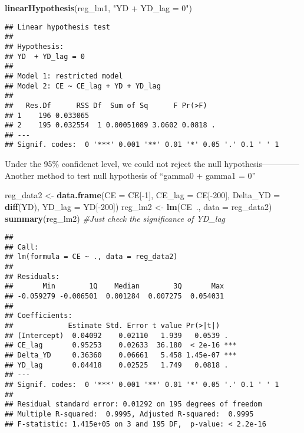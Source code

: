 \documentclass[]{article}
\newenvironment{Shaded}{\begin{snugshade}}{\end{snugshade}}
\newcommand{\KeywordTok}[1]{\textcolor[rgb]{0.13,0.29,0.53}{\textbf{{#1}}}}
\newcommand{\DataTypeTok}[1]{\textcolor[rgb]{0.13,0.29,0.53}{{#1}}}
\newcommand{\DecValTok}[1]{\textcolor[rgb]{0.00,0.00,0.81}{{#1}}}
\newcommand{\StringTok}[1]{\textcolor[rgb]{0.31,0.60,0.02}{{#1}}}
\newcommand{\CommentTok}[1]{\textcolor[rgb]{0.56,0.35,0.01}{\textit{{#1}}}}
\newcommand{\NormalTok}[1]{{#1}}
\begin{document}
\begin{Shaded}
\begin{Highlighting}[]
\KeywordTok{linearHypothesis}\NormalTok{(reg_lm1, }\StringTok{"YD + YD_lag = 0"}\NormalTok{)}
\end{Highlighting}
\end{Shaded}

\begin{verbatim}
## Linear hypothesis test
## 
## Hypothesis:
## YD  + YD_lag = 0
## 
## Model 1: restricted model
## Model 2: CE ~ CE_lag + YD + YD_lag
## 
##   Res.Df      RSS Df  Sum of Sq      F Pr(>F)  
## 1    196 0.033065                              
## 2    195 0.032554  1 0.00051089 3.0602 0.0818 .
## ---
## Signif. codes:  0 '***' 0.001 '**' 0.01 '*' 0.05 '.' 0.1 ' ' 1
\end{verbatim}

Under the 95\% confidenct level, we could not reject the null
hypothesis-------------- Another method to test null hypothesis of
``gamma0 + gamma1 = 0''

\begin{Shaded}
\begin{Highlighting}[]
\NormalTok{reg_data2 <-}\StringTok{ }\KeywordTok{data.frame}\NormalTok{(}\DataTypeTok{CE =} \NormalTok{CE[-}\DecValTok{1}\NormalTok{], }\DataTypeTok{CE_lag =} \NormalTok{CE[-}\DecValTok{200}\NormalTok{], }\DataTypeTok{Delta_YD =} \KeywordTok{diff}\NormalTok{(YD), }\DataTypeTok{YD_lag =} \NormalTok{YD[-}\DecValTok{200}\NormalTok{])}
\NormalTok{reg_lm2 <-}\StringTok{ }\KeywordTok{lm}\NormalTok{(CE~., }\DataTypeTok{data =} \NormalTok{reg_data2)}
\KeywordTok{summary}\NormalTok{(reg_lm2)  }\CommentTok{#Just check the significance of YD_lag}
\end{Highlighting}
\end{Shaded}

\begin{verbatim}
## 
## Call:
## lm(formula = CE ~ ., data = reg_data2)
## 
## Residuals:
##       Min        1Q    Median        3Q       Max 
## -0.059279 -0.006501  0.001284  0.007275  0.054031 
## 
## Coefficients:
##             Estimate Std. Error t value Pr(>|t|)    
## (Intercept)  0.04092    0.02110   1.939   0.0539 .  
## CE_lag       0.95253    0.02633  36.180  < 2e-16 ***
## Delta_YD     0.36360    0.06661   5.458 1.45e-07 ***
## YD_lag       0.04418    0.02525   1.749   0.0818 .  
## ---
## Signif. codes:  0 '***' 0.001 '**' 0.01 '*' 0.05 '.' 0.1 ' ' 1
## 
## Residual standard error: 0.01292 on 195 degrees of freedom
## Multiple R-squared:  0.9995, Adjusted R-squared:  0.9995 
## F-statistic: 1.415e+05 on 3 and 195 DF,  p-value: < 2.2e-16
\end{verbatim}
\end{document}
